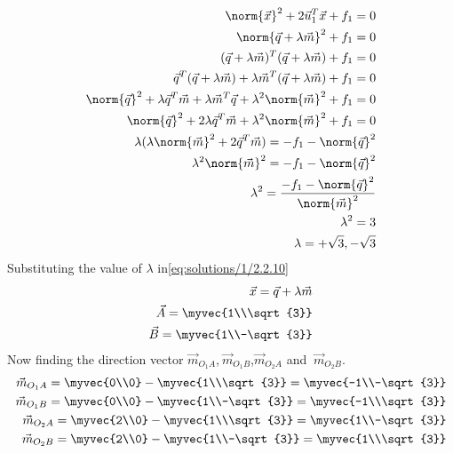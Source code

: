   \begin{align}
 \norm{\vec{x}}^2 + 2\vec{u}_1^T\vec{x} + f_1 = 0\\
 \norm{\vec{q}+\lambda\vec{m}}^2 + f_1 = 0\\
 (\vec{q}+\lambda \vec{m})^T(\vec{q}+\lambda \vec{m})+f_1=0\\
 \vec{q}^T(\vec{q}+\lambda \vec{m})+\lambda \vec{m}^T(\vec{q}+\lambda \vec{m})+f_1=0\\
 \norm{\vec{q}}^2+\lambda\vec{q}^T\vec{m}+\lambda\vec{m}^T\vec{q}+\lambda^2\norm{\vec{m}}^2+f_1=0\\
 \norm{\vec{q}}^2+2\lambda\vec{q}^T\vec{m}+\lambda^2\norm{\vec{m}}^2+f_1=0 \\
\lambda(\lambda\norm{\vec{m}}^2+2\vec{q}^T\vec{m})=-f_1-\norm{\vec{q}}^2\\
\lambda^2\norm{\vec{m}}^2=-f_1-\norm{\vec{q}}^2\\
\lambda^2=\frac{-f_1-\norm{\vec{q}}^2}{\norm{\vec{m}}^2}\\
\lambda^2=3\\
 \lambda=+\sqrt{3},-\sqrt{3}
 \end{align}
Substituting the value of $\lambda$ in\eqref{eq:solutions/1/2.2.10}
\begin{align}
\vec{x}=\vec{q}+\lambda\vec{m}\\
\vec{A}=\myvec{1\\\sqrt{3}}\\
\vec{B}=\myvec{1\\-\sqrt{3}}
 \end{align} 
 Now finding the direction vector $ \vec{m}_{O_1A}$,$\ \vec{m}_{O_1B}$,$ \vec{m}_{O_2A}$ and $\ \vec{m}_{O_2B}$.
\begin{align}
\vec{m}_{O_1A}=\myvec{0\\0}-\myvec{1\\\sqrt{3}}=\myvec{-1\\-\sqrt{3}}\\
\vec{m}_{O_1B}=\myvec{0\\0}-\myvec{1\\-\sqrt{3}}=\myvec{-1\\\sqrt{3}}\\
\vec{m}_{O_2A}=\myvec{2\\0}-\myvec{1\\\sqrt{3}}=\myvec{1\\-\sqrt{3}}\\
\vec{m}_{O_2B}=\myvec{2\\0}-\myvec{1\\-\sqrt{3}}=\myvec{1\\\sqrt{3}}
\end{align}
